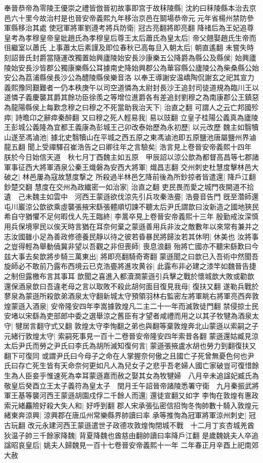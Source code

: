 奉晉恭帝為零陵王優崇之禮皆倣晉初故事即宫于故秣陵縣|{
	沈約曰秣陵縣本治去京邑六十里今故治村是也晉安帝義熙九年移治京邑在鬬場恭帝元元年省楊州禁防參軍縣移治其處}
使冠軍將軍劉遵考將兵防衛|{
	冠古亮翻將即亮翻}
降禇后為王妃追尊皇考為孝穆皇帝皇妣趙氏為孝穆皇后尊王太后蕭氏為皇太后|{
	帝父翹娶趙氏生帝而徂繼室以蕭氏}
上事蕭太后素謹及即位春秋已高每旦入朝太后|{
	朝直遙翻}
未嘗失時刻詔晉氏封爵當隨運改獨置始興廬陵始安長沙康樂五公降爵為縣公及縣侯|{
	始興廬陵始安長沙皆郡公獨康樂縣公耳據南史降始興郡公為華容縣公廬陵公為柴桑縣公始安公為荔浦縣侯長沙公為醴陵縣侯樂音洛}
以奉王導謝安温嶠陶侃謝玄之祀其宣力義熙豫同艱難者一仍本秩庚午以司空道憐為太尉封長沙王追封司徒道規為臨川王以道憐子義慶襲其爵其餘功臣徐羨之等增位進爵各有差追封劉穆之為南康郡公王鎮惡為龍陽縣侯上每歎念穆之曰穆之不死當助我治天下|{
	治直之翻}
可謂人之云亡邦國殄瘁|{
	詩曕卬之辭瘁秦醉翻}
又曰穆之死人輕易我|{
	易以豉翻}
立皇子桂陽公義真為廬陵王彭城公義隆為宜都王義康為彭城王己卯改泰始歷為永初歷|{
	以元改歷}
魏主如翳犢山遂至馮滷池|{
	據北史翳犢山在平城之西五原之東馮滷池即五原鹽池唐屬鹽州界滷龍五翻}
聞上受禪驛召崔浩告之曰卿往年之言驗矣|{
	浩言見上卷晉安帝義熙十四年}
朕於今日始信天道　秋七月丁酉魏主如五原　甲辰詔以涼公歆為都督高昌等七郡諸軍事征西大將軍酒泉公秦王熾磐為安西大將軍|{
	熾昌志翻}
交州刺史杜慧度擊林邑大破之|{
	林邑屢為寇故慧度撃之}
所殺過半林邑乞降前後為所鈔掠者皆遣還|{
	降戶江翻鈔楚交翻}
慧度在交州為政纎密一如治家|{
	治直之翻}
吏民畏而愛之城門夜開道不拾遺　己未魏主如雲中　河西王蒙遜欲伐涼先引兵攻秦浩亹|{
	浩亹音告門}
旣至濳師還屯川巖涼公歆欲乘虛襲張掖宋繇張體順切諫不聽太后尹氏謂歆曰汝新造之國地狹民希自守猶懼不足何暇伐人先王臨終|{
	李暠卒見上卷晉安帝義熙十三年}
殷勤戒汝深慎用兵保境寧民以俟天時言猶在耳奈何棄之蒙遜善用兵非汝之敵數年以來常有兼并之志汝國雖小足為善政修德養民靜以待之彼若昏暴民將歸汝若其休明|{
	休美也}
汝將事之豈得輕為舉動僥冀非望以吾觀之非但喪師|{
	喪息浪翻}
殆將亡國亦不聽宋繇歎曰今兹大事去矣歆將步騎三萬東出|{
	將即亮翻騎奇寄翻}
蒙遜聞之曰歆已入吾術中然聞吾旋師必不敢前乃露布西境云已克浩亹將進攻黄谷|{
	此露布非必建之漆竿如魏晉告捷之制但露檄布言其事耳}
歆聞之喜進入都瀆澗蒙遜引兵擊之戰於懷城歆大敗或勸歆還保酒泉歆曰吾違老母之言以取敗不殺此胡何面目復見我母|{
	復扶又翻}
遂勒兵戰於蓼泉為蒙遜所殺歆弟酒泉太守翻新城太守預領羽林右監密左將軍眺右將軍亮西奔敦煌蒙遜入酒泉|{
	安帝隆安四年李嵩據敦煌凡二主二十一年而滅敦徒門翻}
禁侵掠士民安堵以宋繇為吏部郎中委之選舉涼之舊臣有才望者咸禮而用之以其子牧犍為酒泉太守|{
	犍居言翻守式又翻}
敦煌太守李恂翻之弟也與翻等棄敦煌奔北山蒙遜以索嗣之子元緒行敦煌太守|{
	索嗣死事見一百十二卷晉安帝隆安四年索昔各翻}
蒙遜還姑臧見涼太后尹氏而勞之尹氏曰李氏為胡所滅知復何言|{
	蒙遜張掖盧水胡也勞力到翻復扶又翻下可復同}
或謂尹氏曰今母子之命在人掌握奈何傲之且國亡子死曾無憂色何也尹氏曰存亡死生皆有天命奈何更如凡人為兒女子之悲乎吾老婦人國亡家破豈可復惜餘生為人臣妾乎惟速死為幸耳蒙遜嘉而赦之娶其女為牧犍婦　八月辛未追諡妃臧氏為敬皇后癸酉立王太子義符為皇太子　閏月壬午詔晉帝諸陵悉署守衛　九月秦振武將軍王基等襲河西王蒙遜胡園戍俘二千餘人而還|{
	還徒宣翻又如字}
李恂在敦煌有惠政索元緒麤險好殺大失人和|{
	好呼到翻}
郡人宋承張弘密信招恂冬恂帥數十騎入敦煌元緒東奔涼興|{
	涼興郡在唐瓜州常樂縣界帥讀曰率}
承等推恂為冠軍將軍涼州刺史|{
	冠古玩翻}
改元永建河西王蒙遜遣世子政德攻敦煌恂閉城不戰　十二月丁亥杏城羌酋狄温子帥三千餘家降魏|{
	背夏降魏也酋慈由翻帥讀曰率降戶江翻}
是歲魏姚夫人卒追諡昭哀皇后|{
	姚夫人歸魏見一百十七卷晉安帝義熙十一年}
二年春正月辛酉上祀南郊大赦

